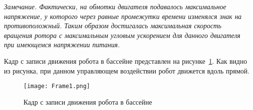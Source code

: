 %	
%	
%	
%	
%	

\textit{Замечание. Фактически, на обмотки двигателя подавалось максимальное напряжение, у которого через равные промежутки времени изменялся знак на противоположный. Таким образом достигалась максимальная скорость вращения ротора с максимальным угловым ускорением для данного двигателя при имеющемся напряжении питания.}

Кадр с записи движения робота в бассейне представлен на рисунке~\ref{Frame1}. Как видно из рисунка, при данном управляющем воздействии робот движется вдоль прямой.

\begin{figure}[!ht]
	\centering
	\texttt{[image: Frame1.png]}
	\caption{Кадр с записи движения робота в бассейне}
	\label{Frame1}
\end{figure}

%	
%	





%			




